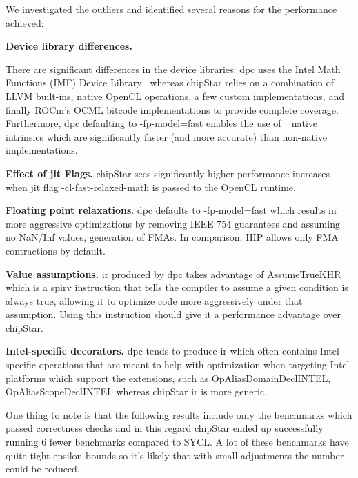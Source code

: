\documentclass[Afour,sageh,times]{sagej}
\newcommand{\mycite}[1]{\citep{#1}}
\begin{document}
We investigated the outliers and identified several reasons for the performance achieved:

\begin{itemize} {
    \item \textbf{Device library differences.} }There are significant differences in the device libraries: \gls{dpc} uses the Intel Math Functions (IMF) Device Library~\mycite{imf-website} whereas chipStar relies on a combination of LLVM built-ins, native OpenCL operations, a few custom implementations, and finally ROCm's OCML bitcode  implementations to provide complete coverage. Furthermore, \gls{dpc} defaulting to -fp-model=fast enables the use of \_native intrinsics which are significantly faster (and more accurate) than non-native implementations.
    \item \textbf{Effect of \gls{jit} Flags. } chipStar sees significantly higher performance increases when \gls{jit} flag  -cl-fast-relaxed-math is passed to the OpenCL runtime. 
    \item \textbf{Floating point relaxations}. \gls{dpc} defaults to -fp-model=fast which results in more aggressive optimizations by removing IEEE 754 guarantees and assuming no NaN/Inf values, generation of FMAs. In comparison, HIP allows only FMA contractions by default.

    \item \textbf{Value assumptions.} \gls{ir} produced by \gls{dpc} takes advantage of AssumeTrueKHR which is a \gls{spirv} instruction that tells the compiler to assume a given condition is always true, allowing it to optimize code more aggressively under that assumption. Using this instruction should give it a performance advantage over chipStar. 
    \item \textbf{Intel-specific decorators.} \gls{dpc} tends to produce \gls{ir} which often contains Intel-specific operations that are meant to help with optimization when targeting Intel platforms which support the extensions, such as OpAliasDomainDeclINTEL, OpAliasScopeDeclINTEL whereas chipStar \gls{ir} is more generic.

\end{itemize}

One thing to note is that the following results include only the benchmarks which passed correctness checks and in this regard chipStar ended up successfully running 6 fewer benchmarks compared to SYCL. A lot of these benchmarks have quite tight epsilon bounds so it's likely that with small adjustments the number could be reduced.
\end{document}
